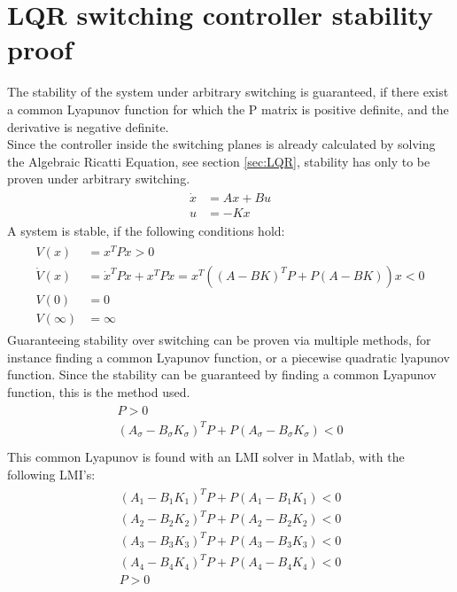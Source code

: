 \chapter{LQR switching controller stability proof}
The stability of the system under arbitrary switching is guaranteed, if there exist a common Lyapunov function for which the P matrix is positive definite, and the derivative is negative definite.\\
Since the controller inside the switching planes is already calculated by solving the Algebraic Ricatti Equation, see section \ref{sec:LQR}, stability has only to be proven under arbitrary switching.
\begin{eqnarray}
\begin{aligned}
\dot{x}&=Ax+Bu\\
u&=-Kx
\end{aligned}
\end{eqnarray}
A system is stable, if the following conditions hold:
\begin{eqnarray}
\begin{aligned}
V\left(x\right)&=x^TPx>0\\
\dot{V}\left(x\right)&=\dot{x}^TPx+x^TP\dot{x}= x^T\left(\left(A-BK\right)^TP+P\left(A-BK\right)\right)x<0\\
V\left(0\right)&=0\\
V\left(\infty\right)&=\infty
\end{aligned}
\end{eqnarray}
Guaranteeing stability over switching can be proven via multiple methods, for instance finding a common Lyapunov function, or a piecewise quadratic lyapunov function.
Since the stability can be guaranteed by finding a common Lyapunov function, this is the method used.
\begin{eqnarray}
\begin{aligned}
P>0\\
\left(A_\sigma-B_\sigma K_\sigma\right)^TP+P\left(A_\sigma-B_\sigma K_\sigma\right)<0\\
\end{aligned}
\end{eqnarray} 
This common Lyapunov is found with an LMI solver in Matlab, with the following LMI's:
\begin{eqnarray}
\begin{aligned}
\left(A_1-B_1 K_1\right)^TP+P\left(A_1-B_1 K_1\right)<0\\
\left(A_2-B_2 K_2\right)^TP+P\left(A_2-B_2 K_2\right)<0\\
\left(A_3-B_3 K_3\right)^TP+P\left(A_3-B_3 K_3\right)<0\\
\left(A_4-B_4 K_4\right)^TP+P\left(A_4-B_4 K_4\right)<0\\
P>0
\end{aligned}
\end{eqnarray}
